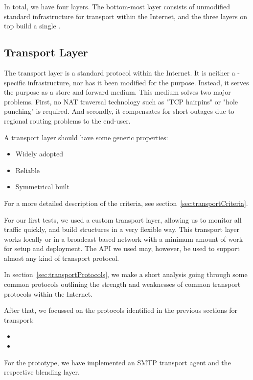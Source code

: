 In total, we have four layers. The bottom-most layer consists of unmodified standard infrastructure for transport within the Internet, and the three layers on top build a single \VortexNode.

\subsection{Transport Layer}
The transport layer is a standard protocol within the Internet. It is neither a \MessageVortex{}-specific infrastructure, nor has it been modified for the purpose. Instead, it serves the purpose as a store and forward medium. This medium solves two major problems. First, no NAT traversal technology such as "TCP hairpins" or "hole punching" is required. And secondly, it compensates for short outages due to regional routing problems to the end-user.

A transport layer should have some generic properties:
\begin{itemize}
	\item Widely adopted 
	\item Reliable
	\item Symmetrical built 
\end{itemize}

For a more detailed description of the criteria, see section~\ref{sec:transportCriteria}.

For our first tests, we used a custom transport layer, allowing us to monitor all traffic quickly, and build structures in a very flexible way. This transport layer works locally or in a broadcast-based network with a minimum amount of work for setup and deployment. The API we used may, however, be used to support almost any kind of transport protocol.

In section~\ref{sec:transportProtocols}, we make a short analysis going through some common protocols outlining the strength and weaknesses of common transport protocols within the Internet.

After that, we focussed on the protocols identified in the previous sections for transport:
\begin{itemize}
	\item {}
	\item {}
\end{itemize}
For the prototype, we have implemented an SMTP transport agent and the respective blending layer.


